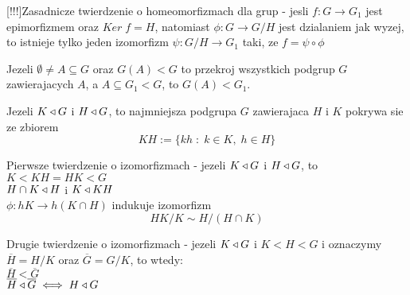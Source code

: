 \begin{multicols*}{2}
    {\color{cyan}[!!!]}{\color{def}Zasadnicze twierdzenie o homeomorfizmach dla grup} - jesli $f:G\to G_1$ jest epimorfizmem oraz $Ker\;f=H$, natomiast $\phi:G\to G/H$ jest dzialaniem jak wyzej, to istnieje tylko jeden izomorfizm $\psi:G/H\to G_1$ taki, ze $f=\psi\circ \phi$\medskip

    \medskip

    Jezeli $\emptyset\neq A\subseteq G$ oraz $G(A)<G$ to przekroj wszystkich podgrup $G$ zawierajacych $A$, a $A\subseteq G_1<G$, to $G(A)<G_1$.\medskip

    Jezeli $K\triangleleft G$ i $H\triangleleft G$, to najmniejsza podgrupa $G$ zawierajaca $H$ i $K$ pokrywa sie ze zbiorem
    $$KH:=\{kh\;:\;k\in K,\;h\in H\}$$

    {\color{def}Pierwsze twierdzenie o izomorfizmach} - jezeli $K\triangleleft G$ i $H\triangleleft G$, to \smallskip\\
    \point $K<KH=HK<G$\smallskip\\
    \point $H\cap K\triangleleft H$ i $K\triangleleft KH$\smallskip\\
    \point $\phi:hK\to h(K\cap H)$ indukuje izomorfizm 
    $$HK/K\sim H/(H\cap K)$$

    {\color{def}Drugie twierdzenie o izomorfizmach} - jezeli $K\triangleleft G$ i $K<H<G$ i oznaczymy $\overline H = H/K$ oraz $\overline G=G/K$, to wtedy:\smallskip\\
    \point $\overline H<\overline G$\smallskip\\
    \point $\overline H\triangleleft\overline G\iff H\triangleleft G$

\end{multicols*}